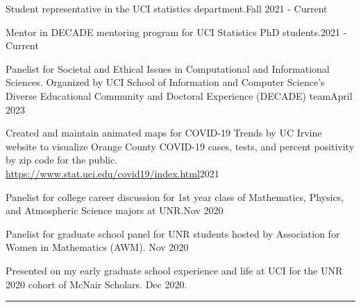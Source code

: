 \documentclass{article}
\begin{document}
	


\begin{description}
	\vspace{-2mm}
	\item[Professional Service and Outreach]\hspace*{.1in} 
	
		Student representative in the UCI statistics department.\hfill{Fall 2021 - Current}
		
		Mentor in DECADE mentoring program for UCI Statistics PhD students.\hfill{2021 - Current} \\ \vspace{-3mm}
	
		Panelist for Societal and Ethical Issues in Computational and Informational Sciences. Organized by UCI School of Information and Computer Science's Diverse Educational Community and Doctoral Experience (DECADE) team\hfill{April 2023}
	
		Created and maintain animated maps for COVID-19 Trends by UC Irvine website to visualize Orange County COVID-19 cases, tests, and percent positivity by zip code for the public.\\
		\url{https://www.stat.uci.edu/covid19/index.html}\hfill{2021} \\ \vspace{-3mm}
	
		Panelist for college career discussion for 1st year class of Mathematics, Physics, and Atmospheric Science majors at UNR.\hfill{Nov 2020}\\ \vspace{-3mm}
		
		Panelist for graduate school panel for UNR students hosted by Association for Women in Mathematics (AWM). \hfill{Nov 2020}\\ \vspace{-3mm}
		
		Presented on my early graduate school experience and life at UCI for the UNR 2020 cohort of McNair Scholars. \hfill{Dec 2020}.
	
\end{description}
\vspace{-2mm}
\rule{\linewidth}{1pt}


\end{document}
